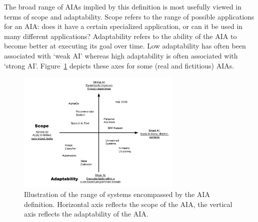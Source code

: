 The broad range of AIAs implied by this definition is most usefully viewed in terms of scope and adaptability. Scope refers to the range of possible applications for an AIA: does it have a certain specialized application, or can it be used in many different applications? %
Adaptability refers to the ability of the AIA to become better at executing its goal over time. Low adaptability has often been associated with `weak AI' whereas high adaptability is often associated with `strong AI'.  Figure~\ref{fig:StrongWeak} depicts these axes for some (real and fictitious) AIAs.

	\begin{figure}[htbp]
    	\centering
     	\includegraphics[width=0.7\textwidth]{Figures/strong_weak_narrow_broad.pdf}
    	\caption{Illustration of the range of systems encompassed by the AIA definition. Horizontal axis reflects the scope of the AIA, the vertical axis reflects the adaptability of the AIA.}
        \label{fig:StrongWeak}
    \end{figure}

